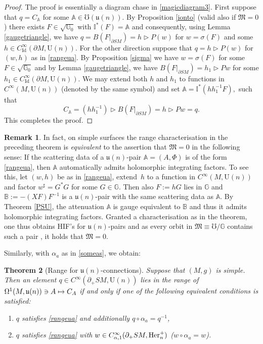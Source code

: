 \documentclass[JEP,XML,SOM,Unicode,published]{cedram}
\newcommand\mto{\mathchoice{\longmapsto}{\mapsto}{\mapsto}{\mapsto}}
\newcommand{\rU}{\mathrm{U}}
\theoremstyle{plain}
\newtheorem{theorem}{Theorem}[section]
\theoremstyle{definition}
\newtheorem{remark}[theorem]{Remark}
\newcommand{\A}{\mathbb{A}}
\newcommand{\B}{\mathbb{B}}
\newcommand{\G}{\mathbb{G}}
\newcommand{\I}{\mathbb{I}}
\newcommand{\M}{\mathfrak{M}}
\renewcommand{\u}{\mathfrak{u}}
\newcommand{\he}{\textup{Her}}
\newcommand{\Id}{\mathrm{Id}}
\newcommand{\1}{{\bf 1}}
\let\lact\triangleright
\begin{document}
\begin{proof}
The proof is essentially a diagram chase in \eqref{magicdiagram3}. First suppose that $q=C_\A$ for some $\A\in\mho(\u(n))$. By Proposition \ref{ionto} (valid also if $\M=0$) there exists $F\in \sqrt{\G_0}$ with $\I^*(F)=\A$ and consequently, using Lemma \ref{gaugetriangle}, we have $q = B(F\vert_{\partial SM})= h\lact P(w)$ for $w= \sigma(F)$ and some $h\in C^\infty_\Id(\partial M,\rU(n))$. For the other direction suppose that $q=h\lact P(w)$ for $(w,h)$ as in \eqref{rangeua}. By Proposition \ref{sigma} we have $w=\sigma (F)$ for some $F\in \sqrt{\G_0}$ and by Lemma \ref{gaugetriangle}, we have $B(F\vert_{\partial SM}) = h_1\lact Pw$ for some $h_1\in C^\infty_\Id(\partial M,\rU(n))$. We may extend both $h$ and $h_1$ to functions in $C^\infty(M,\rU(n))$ (denoted by the same symbol) and set $
\A = \I^*(hh_1^{-1} F),
$
such that
\begin{equation*}
C_\A = (hh_1^{-1})\lact B(F\vert_{\partial SM}) = h\lact Pw= q.
\end{equation*}
This completes the proof.
\end{proof}

\begin{remark}\label{equivalenceoftheorems}
In fact, on simple surfaces the range characterisation in the preceding theorem is \emph{equivalent} to the assertion that $\M=0$ in the following sense: If the scattering data of a $\u(n)$-pair $\A=(A,\Phi)$ is of the form \eqref{rangeua}, then $\A$ automatically admits holomorphic integrating factors. To see this, let $(w,h)$ be as in \eqref{rangeua}, extend~$h$ to a function in $C^\infty(M,\rU(n))$ and factor $w^\sharp = G^*G$ for some $G\in \G$. Then also $F:=hG$ lies in $\G$ and $\B:=-(XF)F^{-1}$ is a $\u(n)$-pair with the same scattering data as $\A$. By Theorem \ref{PSU}, the attenuation $\A$ is gauge equivalent to $\B$ and thus it admits holomorphic integrating factors.
Granted a characterisation as in the theorem, one thus obtains HIF's for $\u(n)$-pairs and as every orbit in $\M\equiv \mho/\G$ contains such a pair \cite[Lem.\,5.2]{PaSa20}, it holds that $\M=0$.
\end{remark}

Similarly, with $\alpha_a$ as in \eqref{someas}, we obtain:

\begin{theorem}[Range for $\u(n)$-connections]\label{rangeconnection}
Suppose that $(M,g)$ is simple. Then an element $q\in C^\infty(\partial_+SM,\rU(n))$ lies in the range of $\Omega^1(M,\u(n))\ni A \mto C_A$ if and only if one of the following equivalent conditions is satisfied:
\begin{enumerate}
\item \label{rangeconn1} $q$ satisfies \eqref{rangeua} and additionally $q\circ\alpha_a=q^{-1}$,
\item \label{rangeconn2} $q$ satisfies \eqref{rangeua} with $w\in C_{\alpha,1}^\infty(\partial_+SM,\he^+_n)$ (\ie $w\circ\alpha_a=w$).
\end{enumerate}
\end{theorem}
\end{document}
